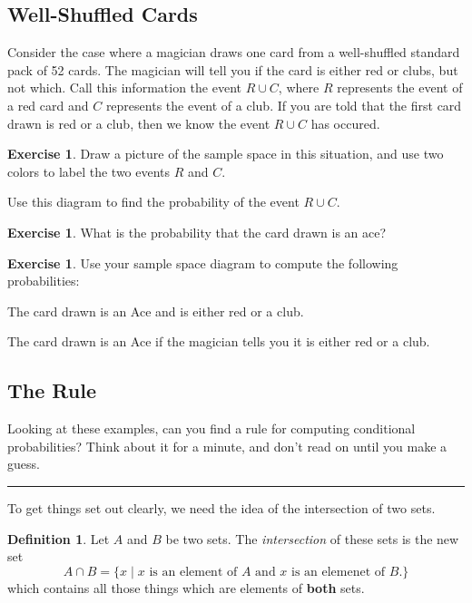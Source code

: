 \documentclass[12pt,letterpaper]{article}
\theoremstyle{definition}
\newtheorem{exercise}[question]{Exercise}
\newtheorem*{definition}{Definition}
\begin{document}
\subsection*{Well-Shuffled Cards}
Consider the case where a magician draws one card from a well-shuffled standard pack of 52 cards. The magician will tell you if the card is either red or clubs, but not which. Call this information the event $R\cup C$, where $R$ represents the event of a red card and $C$ represents the event of a club. If you are told that the first card drawn is red or a club, then we know the event $R\cup C$ has occured.

\begin{exercise}
Draw a picture of the sample space in this situation, and use two colors to label the two events $R$ and $C$.

Use this diagram to find the probability of the event $R \cup C$.
\end{exercise}
\begin{exercise}
What is the probability that the card drawn is an ace?
\end{exercise}
\begin{exercise}
Use your sample space diagram to compute the following probabilities:
\begin{compactitem}
\item The card drawn is an Ace and is either red or a club.
\item The card drawn is an Ace if the magician tells you it is either red or a club.
\end{compactitem}
\end{exercise}


\subsection*{The Rule}

Looking at these examples, can you find a rule for computing conditional probabilities?
Think about it for a minute, and don't read on until you make a guess.

\vspace{1cm}

\hrule

\vspace{1cm}

To get things set out clearly, we need the idea of the intersection of two sets.

\begin{definition}
Let $A$ and $B$ be two sets.
The \emph{intersection} of these sets is the new set
\[
A \cap B = \{ x \mid \text{$x$ is an element of $A$ and $x$ is an elemenet of $B$.} \}
\]
which contains all those things which are elements of \textbf{both} sets.
\end{definition}
\end{document}
